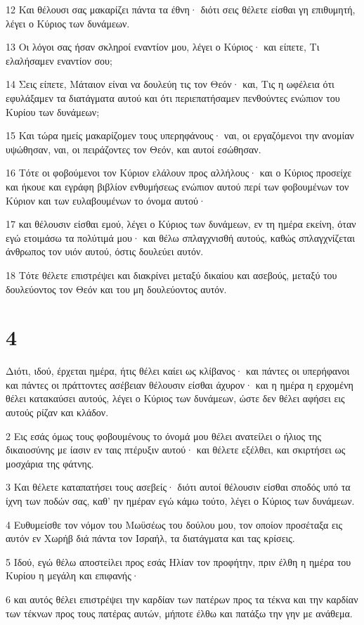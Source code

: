 \par 12 Και θέλουσι σας μακαρίζει πάντα τα έθνη· διότι σεις θέλετε είσθαι γη επιθυμητή, λέγει ο Κύριος των δυνάμεων.
\par 13 Οι λόγοι σας ήσαν σκληροί εναντίον μου, λέγει ο Κύριος· και είπετε, Τι ελαλήσαμεν εναντίον σου;
\par 14 Σεις είπετε, Μάταιον είναι να δουλεύη τις τον Θεόν· και, Τις η ωφέλεια ότι εφυλάξαμεν τα διατάγματα αυτού και ότι περιεπατήσαμεν πενθούντες ενώπιον του Κυρίου των δυνάμεων;
\par 15 Και τώρα ημείς μακαρίζομεν τους υπερηφάνους· ναι, οι εργαζόμενοι την ανομίαν υψώθησαν, ναι, οι πειράζοντες τον Θεόν, και αυτοί εσώθησαν.
\par 16 Τότε οι φοβούμενοι τον Κύριον ελάλουν προς αλλήλους· και ο Κύριος προσείχε και ήκουε και εγράφη βιβλίον ενθυμήσεως ενώπιον αυτού περί των φοβουμένων τον Κύριον και των ευλαβουμένων το όνομα αυτού·
\par 17 και θέλουσιν είσθαι εμού, λέγει ο Κύριος των δυνάμεων, εν τη ημέρα εκείνη, όταν εγώ ετοιμάσω τα πολύτιμά μου· και θέλω σπλαγχνισθή αυτούς, καθώς σπλαγχνίζεται άνθρωπος τον υιόν αυτού, όστις δουλεύει αυτόν.
\par 18 Τότε θέλετε επιστρέψει και διακρίνει μεταξύ δικαίου και ασεβούς, μεταξύ του δουλεύοντος τον Θεόν και του μη δουλεύοντος αυτόν.

\chapter{4}

\par Διότι, ιδού, έρχεται ημέρα, ήτις θέλει καίει ως κλίβανος· και πάντες οι υπερήφανοι και πάντες οι πράττοντες ασέβειαν θέλουσιν είσθαι άχυρον· και η ημέρα η ερχομένη θέλει κατακαύσει αυτούς, λέγει ο Κύριος των δυνάμεων, ώστε δεν θέλει αφήσει εις αυτούς ρίζαν και κλάδον.
\par 2 Εις εσάς όμως τους φοβουμένους το όνομά μου θέλει ανατείλει ο ήλιος της δικαιοσύνης με ίασιν εν ταις πτέρυξιν αυτού· και θέλετε εξέλθει, και σκιρτήσει ως μοσχάρια της φάτνης.
\par 3 Και θέλετε καταπατήσει τους ασεβείς· διότι αυτοί θέλουσιν είσθαι σποδός υπό τα ίχνη των ποδών σας, καθ' ην ημέραν εγώ κάμω τούτο, λέγει ο Κύριος των δυνάμεων.
\par 4 Ευθυμείσθε τον νόμον του Μωϋσέως του δούλου μου, τον οποίον προσέταξα εις αυτόν εν Χωρήβ διά πάντα τον Ισραήλ, τα διατάγματα και τας κρίσεις.
\par 5 Ιδού, εγώ θέλω αποστείλει προς εσάς Ηλίαν τον προφήτην, πριν έλθη η ημέρα του Κυρίου η μεγάλη και επιφανής·
\par 6 και αυτός θέλει επιστρέψει την καρδίαν των πατέρων προς τα τέκνα και την καρδίαν των τέκνων προς τους πατέρας αυτών, μήποτε έλθω και πατάξω την γην με ανάθεμα.


